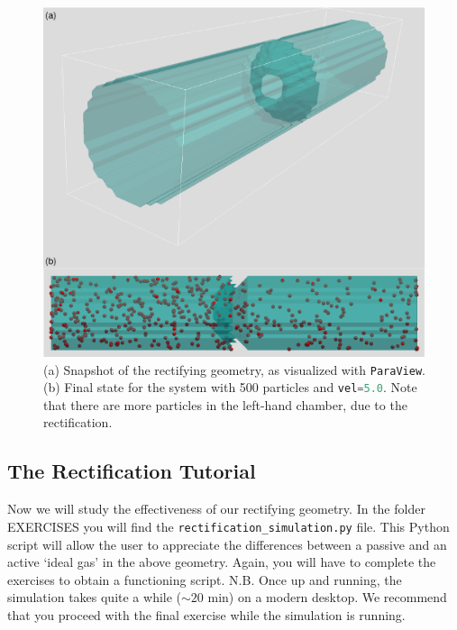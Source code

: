 \documentclass[aip,jcp,reprint,a4paper,onecolumn,amsmath]{revtex4-1}
\newcommand\code{\lstinline}
\newcommand\codees{\lstinline[language=python]}
\begin{document}
\begin{figure}[!htb]
\begin{center}
\includegraphics[scale=0.75]{FIGURES/rectify}
\end{center}
\caption{\label{fig:rectify}(a) Snapshot of the rectifying geometry, as visualized with \code{ParaView}. (b) Final state for the system with 500 particles and \codees{vel=5.0}. Note that there are more particles in the left-hand chamber, due to the rectification.}
\end{figure}

\subsection{\label{sub:rstut}The Rectification Tutorial}

Now we will study the effectiveness of our rectifying geometry. In the folder
EXERCISES you will find the \code{rectification_simulation.py} file. This
Python script will allow the user to appreciate the differences between a
passive and an active `ideal gas' in the above geometry. Again, you will have
to complete the exercises to obtain a functioning script. N.B. Once up and
running, the simulation takes quite a while ($\sim20$ min) on a modern desktop.
We recommend that you proceed with the final exercise while the simulation is
running.
\end{document}
